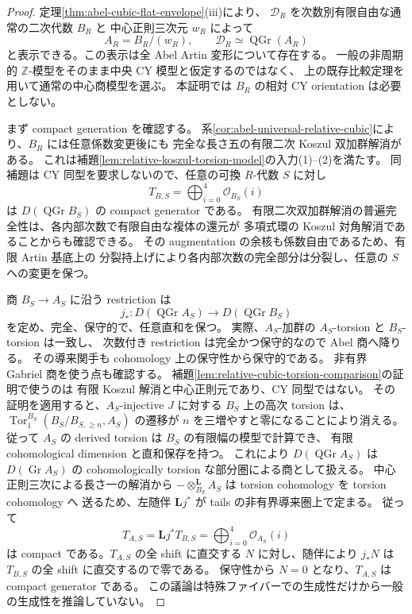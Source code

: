 \begin{proof}
定理\ref{thm:abel-cubic-flat-envelope}\textup{(iii)}により、
$\mathcal D_R$ を次数別有限自由な通常の二次代数 $B_R$ と
中心正則三次元 $w_R$ によって
\[
 A_R=B_R/(w_R),\qquad
 \mathcal D_R\simeq\operatorname{QGr}(A_R)
\]
と表示できる。この表示は全 Abel Artin 変形について存在する。
一般の非周期的 $\mathbb Z$-模型をそのまま中央 CY 模型と仮定するのではなく、
上の既存比較定理を用いて通常の中心商模型を選ぶ。
本証明では $B_R$ の相対 CY orientation は必要としない。

まず compact generation を確認する。
系\ref{cor:abel-universal-relative-cubic}により、$B_R$ には任意係数変更後にも
完全な長さ五の有限二次 Koszul 双加群解消がある。
これは補題\ref{lem:relative-koszul-torsion-model}の入力\textup{(1)--(2)}を満たす。
同補題は CY 同型を要求しないので、任意の可換 $R$-代数 $S$ に対し
\[
 T_{B,S}=\bigoplus_{i=0}^{4}\mathcal O_{B_S}(i)
\]
は $D(\operatorname{QGr}B_S)$ の compact generator である。
有限二次双加群解消の普遍完全性は、各内部次数で有限自由な複体の還元が
多項式環の Koszul 対角解消であることからも確認できる。
その augmentation の余核も係数自由であるため、有限 Artin 基底上の
分裂持上げにより各内部次数の完全部分は分裂し、任意の $S$ への変更を保つ。

商 $B_S\to A_S$ に沿う restriction は
\[
 j_*:D(\operatorname{QGr}A_S)\longrightarrow D(\operatorname{QGr}B_S)
\]
を定め、完全、保守的で、任意直和を保つ。
実際、$A_S$-加群の $A_S$-torsion と $B_S$-torsion は一致し、
次数付き restriction は完全かつ保守的なので Abel 商へ降りる。
その導来関手も cohomology 上の保守性から保守的である。
非有界 Gabriel 商を使う点も確認する。
補題\ref{lem:relative-cubic-torsion-comparison}の証明で使うのは
有限 Koszul 解消と中心正則元であり、CY 同型ではない。
その証明を適用すると、$A_S$-injective $J$ に対する $B_S$ 上の高次 torsion は、
$\operatorname{Tor}_1^{B_S}(B_S/B_{S,\ge n},A_S)$ の遷移が
$n$ を三増やすと零になることにより消える。
従って $A_S$ の derived torsion は $B_S$ の有限幅の模型で計算でき、
有限 cohomological dimension と直和保存を持つ。
これにより $D(\operatorname{QGr}A_S)$ は
$D(\operatorname{Gr}A_S)$ の cohomologically torsion な部分圏による商として扱える。
中心正則三次による長さ一の解消から
$-\otimes_{B_S}^{\mathbf L}A_S$ は torsion cohomology を torsion cohomology へ
送るため、左随伴 $\mathbf Lj^*$ が tails の非有界導来圏上で定まる。
従って
\[
 T_{A,S}=\mathbf Lj^*T_{B,S}
         =\bigoplus_{i=0}^{4}\mathcal O_{A_S}(i)
\]
は compact である。$T_{A,S}$ の全 shift に直交する $N$ に対し、随伴により
$j_*N$ は $T_{B,S}$ の全 shift に直交するので零である。
保守性から $N=0$ となり、$T_{A,S}$ は compact generator である。
この議論は特殊ファイバーでの生成性だけから一般の生成性を推論していない。


\end{proof}
